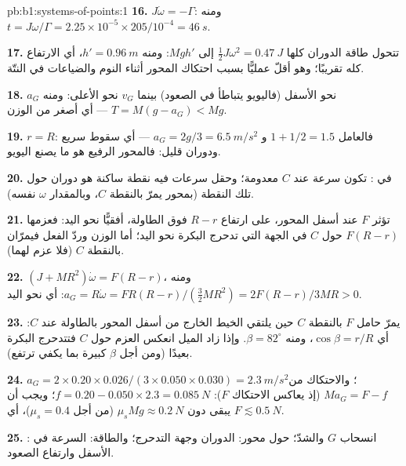 \begin{solution}{pb:b1:systems-of-points:1}
\textbf{16.} $J\dot\omega = -\Gamma$: ومنه $t = J\omega/\Gamma = 2.25\times10^{-5} \times
205/10^{-4} = \qty{46}{s}$.

\textbf{17.} تتحول طاقة الدوران كلها $\tfrac12 J\omega^2 = \qty{0.47}{J}$
إلى $Mgh'$: ومنه $h' = \qty{0.96}{m}$، أي الارتفاع كله تقريبًا؛ وهو أقلّ عمليًّا
بسبب احتكاك المحور أثناء النوم والضياعات في
النتّة.

\textbf{18.} $a_G$ نحو الأسفل (فاليويو يتباطأ في الصعود) بينما
$v_G$ نحو الأعلى: ومنه $T = M(g - a_G) < Mg$ --- أي أصغر من الوزن.

\textbf{19.} $r = R$: فالعامل $1 + 1/2 = 1.5$ و $a_G = 2g/3 = \qty{6.5}{m/s^2}$
--- أي سقوط سريع ودوران قليل: فالمحور الرفيع هو ما يصنع اليويو.

\textbf{20.} في : تكون سرعة  عند $C$
معدومة؛ وحقل سرعات  فيه نقطة ساكنة هو
دوران حول تلك النقطة (بمحور يمرّ بالنقطة $C$، وبالمقدار $\omega$ نفسه).

\textbf{21.} تؤثر $F$ عند أسفل المحور، على ارتفاع $R - r$ فوق
الطاولة، أفقيًّا نحو اليد: فعزمها $F(R - r)$ حول $C$ في
الجهة التي تدحرج البكرة نحو اليد؛ أما الوزن وردّ
الفعل فيمرّان بالنقطة $C$ (فلا عزم لهما).

\textbf{22.} $(J + MR^2)\dot\omega = F(R - r)$، ومنه $a_G = R\dot\omega = FR(R - r)/
(\tfrac32 MR^2) = 2F(R - r)/3MR > 0$: أي نحو اليد.

\textbf{23.} يمرّ حامل $F$ بالنقطة $C$ حين يلتقي الخيط
الخارج من أسفل المحور بالطاولة عند $C$: أي $\cos\beta = r/R$، ومنه
$\beta = 82^\circ$. وإذا زاد الميل انعكس العزم حول $C$ فتتدحرج البكرة
بعيدًا (ومن أجل $\beta$ كبيرة بما يكفي ترتفع).

\textbf{24.} $a_G = 2 \times 0.20 \times 0.026/(3 \times 0.050 \times 0.030) =
\qty{2.3}{m/s^2}$؛ والاحتكاك من $Ma_G = F - f$ (إذ يعاكس الاحتكاك $F$):
$f = 0.20 - 0.050 \times 2.3 = \qty{0.085}{N}$؛ ويجب أن يبقى دون $\mu_sMg
\approx \qty{0.2}{N}$ (من أجل $\mu_s = 0.4$)، أي $F \lesssim \qty{0.5}{N}$.

\textbf{25.} : انسحاب $G$ والشدّ؛
 حول محور: الدوران وجهة التدحرج؛
والطاقة: السرعة في الأسفل وارتفاع الصعود.
\end{solution}
